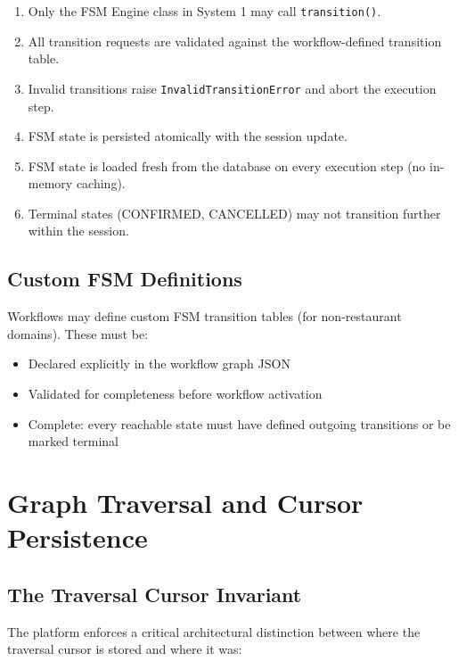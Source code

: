 \documentclass[12pt, a4paper]{report}
\newenvironment{invariantbox}[1]{%
  \begin{tcolorbox}[
    colback=red!4!white,
    colframe=warningred,
    title={\textbf{INVARIANT: #1}},
    fonttitle=\small\bfseries
  ]
}{%
  \end{tcolorbox}
}
\begin{document}
\begin{invariantbox}{FSM Engine Rules}
\begin{enumerate}
  \item Only the FSM Engine class in System 1 may call \texttt{transition()}.
  \item All transition requests are validated against the workflow-defined transition table.
  \item Invalid transitions raise \texttt{InvalidTransitionError} and abort the execution step.
  \item FSM state is persisted atomically with the session update.
  \item FSM state is loaded fresh from the database on every execution step (no in-memory caching).
  \item Terminal states (CONFIRMED, CANCELLED) may not transition further within the session.
\end{enumerate}
\end{invariantbox}

\section{Custom FSM Definitions}

Workflows may define custom FSM transition tables (for non-restaurant domains). These must be:
\begin{itemize}
  \item Declared explicitly in the workflow graph JSON
  \item Validated for completeness before workflow activation
  \item Complete: every reachable state must have defined outgoing transitions or be marked terminal
\end{itemize}

\chapter{Graph Traversal and Cursor Persistence}

\section{The Traversal Cursor Invariant}

The platform enforces a critical architectural distinction between where the traversal cursor is stored and where it was:
\end{document}
